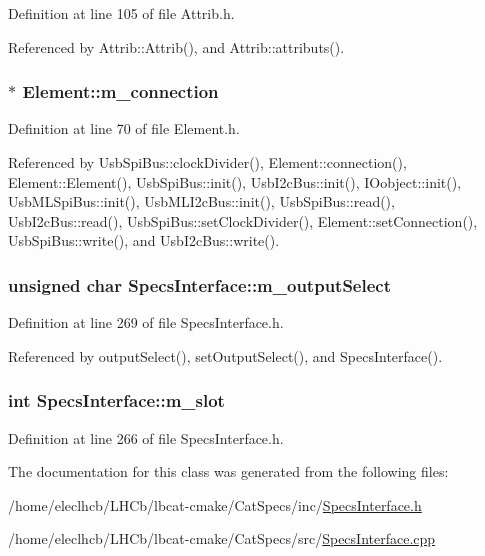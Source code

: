 Definition at line 105 of file Attrib.h.

Referenced by Attrib::Attrib(), and Attrib::attributs().\hypertarget{classElement_abe3de7a5dbbc9a6dd2d7e012e5fdb266}{
\subsubsection[{m\_\-connection}]{$\ast$ {\bf Element::m\_\-connection}}}
\label{classElement_abe3de7a5dbbc9a6dd2d7e012e5fdb266}


Definition at line 70 of file Element.h.

Referenced by UsbSpiBus::clockDivider(), Element::connection(), Element::Element(), UsbSpiBus::init(), UsbI2cBus::init(), IOobject::init(), UsbMLSpiBus::init(), UsbMLI2cBus::init(), UsbSpiBus::read(), UsbI2cBus::read(), UsbSpiBus::setClockDivider(), Element::setConnection(), UsbSpiBus::write(), and UsbI2cBus::write().\hypertarget{classSpecsInterface_a660cb4112ce1c071f277cb6ec115b411}{
\subsubsection[{m\_\-outputSelect}]{\setlength{\rightskip}{0pt plus 5cm}unsigned char {\bf SpecsInterface::m\_\-outputSelect}}}
\label{classSpecsInterface_a660cb4112ce1c071f277cb6ec115b411}


Definition at line 269 of file SpecsInterface.h.

Referenced by outputSelect(), setOutputSelect(), and SpecsInterface().\hypertarget{classSpecsInterface_a7030d3ba54c826b3524f72e57b82ece6}{
\subsubsection[{m\_\-slot}]{\setlength{\rightskip}{0pt plus 5cm}int {\bf SpecsInterface::m\_\-slot}}}
\label{classSpecsInterface_a7030d3ba54c826b3524f72e57b82ece6}


Definition at line 266 of file SpecsInterface.h.

The documentation for this class was generated from the following files:\begin{DoxyCompactItemize}
\item 
/home/eleclhcb/LHCb/lbcat-\/cmake/CatSpecs/inc/\hyperlink{SpecsInterface_8h}{SpecsInterface.h}\item 
/home/eleclhcb/LHCb/lbcat-\/cmake/CatSpecs/src/\hyperlink{SpecsInterface_8cpp}{SpecsInterface.cpp}\end{DoxyCompactItemize}
